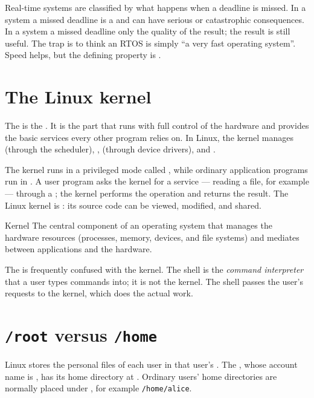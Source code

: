 Real-time systems are classified by what happens when a deadline is missed. In
a  system a missed deadline is a  and can have
serious or catastrophic consequences. In a  system a
missed deadline only  the quality of the result; the result is
still useful. The trap is to think an RTOS is simply ``a very fast operating
system''. Speed helps, but the defining property is .

\section{The Linux kernel}
The  is the . It is the part
that runs with full control of the hardware and provides the basic services
every other program relies on. In Linux, the kernel manages
 (through the scheduler), ,  (through
device drivers), and .

The kernel runs in a privileged mode called , while ordinary
application programs run in . A user program asks the kernel
for a service --- reading a file, for example --- through a ;
the kernel performs the operation and returns the result. The Linux kernel is
: its source code can be viewed, modified, and shared.

\begin{definitionbox}{Kernel}
The central component of an operating system that manages the hardware
resources (processes, memory, devices, and file systems) and mediates between
applications and the hardware.
\end{definitionbox}

The  is frequently confused with the kernel. The shell is the
\emph{command interpreter} that a user types commands into; it is not the
kernel. The shell passes the user's requests to the kernel, which does the
actual work.

\section{\texttt{/root} versus \texttt{/home}}
Linux stores the personal files of each user in that user's . The , whose account name is , has its
home directory at . Ordinary users' home directories are
normally placed under , for example
\texttt{/home/alice}.

